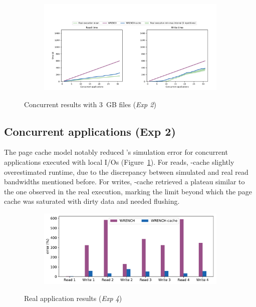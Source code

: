 \begin{figure}
    \begin{subfigure}{\linewidth}
        \centering
        \includegraphics[width=\linewidth]{result/multi/figures/multi_local.pdf}
    \end{subfigure}
    \caption{Concurrent results with 3~GB files (\textit{Exp 2})}
    \label{fig:multi_local}
\end{figure}

\subsection{Concurrent applications (Exp 2)}

The page cache model notably reduced \wrench's simulation error
for concurrent applications executed with local I/Os
(Figure~\ref{fig:multi_local}). For reads, \wrench-cache
slightly overestimated runtime, due to the discrepancy between
simulated and real read bandwidths mentioned before. 
For writes, \wrench-cache
retrieved a plateau similar to the one observed in the real
execution, marking the limit beyond which the page cache was
saturated with dirty data and needed flushing.

\begin{figure}[b]
    \begin{subfigure}{0.95\linewidth}
        \centering
        \includegraphics[width=\linewidth]{result/nighres/figures/nighres_errors.pdf}
    \end{subfigure}
    \caption{Real application results (\textit{Exp 4})}
    \label{fig:nighres}
\end{figure}

